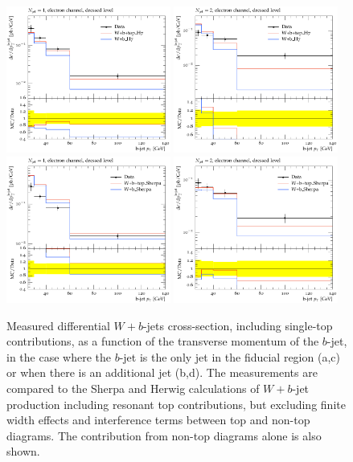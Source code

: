 \documentclass[11pt]{cernrep}
\begin{document}
\begin{figure}
\centering
	\includegraphics[width=0.48\textwidth]{unsubtracted-h7-1jet.pdf}
	\includegraphics[width=0.48\textwidth]{unsubtracted-h7-2jet.pdf}
	\includegraphics[width=0.48\textwidth]{unsubtracted-s22-1jet.pdf}
	\includegraphics[width=0.48\textwidth]{unsubtracted-s22-2jet.pdf}
\caption{\label{fig:unsubtracted}
Measured differential $W+b$-jets cross-section, including single-top contributions, as a function of the transverse momentum of the $b$-jet, 
in the case where the $b$-jet is the only jet in the fiducial region (a,c) or when there is an additional jet (b,d). 
The measurements are compared to the Sherpa and Herwig calculations of $W+b$-jet production including resonant top contributions, but excluding finite width effects 
and interference terms between top and non-top diagrams. The contribution from non-top diagrams alone is also shown.}
\end{figure}
\end{document}
